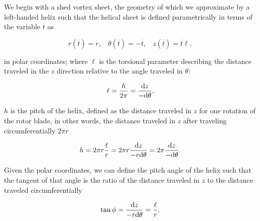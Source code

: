 We begin with a shed vortex sheet, the geometry of which we approximate by a left-handed helix such that the helical sheet is defined parametrically in terms of the variable \(\overline{t}\) as



\begin{equation}
        r(\overline{t}) = r ,~~~~
        \theta(\overline{t}) = -\overline{t} ,~~~~
        z(\overline{t}) =  \overline{t} \ell,
\end{equation}

\noindent in polar coordinates; where \(\ell\) is the torsional parameter describing the distance traveled in the \(z\) direction relative to the angle traveled in \(\theta\):

 \begin{equation}
     \ell = \frac{h}{2\pi} = \frac{\mathrm{d} z}{-\mathrm{d}\theta},
 \end{equation}

 \where  \(h\) is the pitch of the helix, defined as the distance traveled in \(z\) for one rotation of the rotor blade, in other words, the distance traveled in \(z\) after traveling circumferentially \(2\pi r\)

 \begin{equation}
     h = 2\pi r \frac{\ell}{r} = 2\pi r  \frac{\mathrm{d} z}{-r\mathrm{d} \theta} = 2\pi  \frac{\mathrm{d} z}{-\mathrm{d} \theta}.
 \end{equation}

Given the polar coordinates, we can define the pitch angle of the helix such that the tangent of that angle is the ratio of the distance traveled in \(z\) to the distance traveled circumferentially

\begin{equation}
    \tan \phi = \frac{\mathrm{d} z}{-r\mathrm{d} \theta} = \frac{\ell}{r}.
\end{equation}

